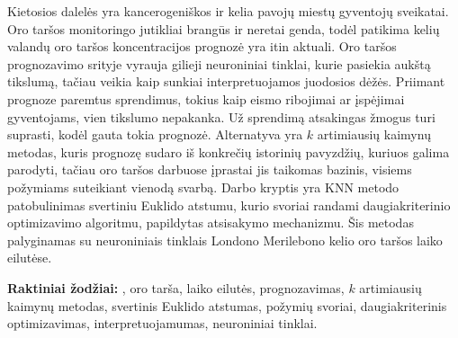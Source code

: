 \documentclass[]{VUMIFTemplateClass}
\begin{document}

    \onehalfspacing
    



    Kietosios dalelės  yra kancerogeniškos ir kelia pavojų miestų gyventojų sveikatai.
    Oro taršos monitoringo jutikliai brangūs ir neretai genda, todėl patikima kelių valandų oro taršos koncentracijos prognozė yra itin aktuali.
    Oro taršos prognozavimo srityje vyrauja gilieji neuroniniai tinklai, kurie pasiekia aukštą tikslumą, tačiau veikia kaip sunkiai interpretuojamos juodosios dėžės.
    Priimant prognoze paremtus sprendimus, tokius kaip eismo ribojimai ar įspėjimai gyventojams, vien tikslumo nepakanka.
    Už sprendimą atsakingas žmogus turi suprasti, kodėl gauta tokia prognozė.
    Alternatyva yra $k$ artimiausių kaimynų metodas, kuris prognozę sudaro iš konkrečių istorinių pavyzdžių, kuriuos galima parodyti, tačiau oro taršos darbuose įprastai jis taikomas bazinis, visiems požymiams suteikiant vienodą svarbą.
    Darbo kryptis yra KNN metodo patobulinimas svertiniu Euklido atstumu, kurio svoriai randami daugiakriterinio optimizavimo algoritmu, papildytas atsisakymo mechanizmu.
    Šis metodas palyginamas su neuroniniais tinklais Londono Merilebono kelio oro taršos laiko eilutėse.

    \textbf{Raktiniai žodžiai:} , oro tarša, laiko eilutės, prognozavimas, $k$ artimiausių kaimynų metodas, svertinis Euklido atstumas, požymių svoriai, daugiakriterinis optimizavimas, interpretuojamumas, neuroniniai tinklai.

\end{document}
